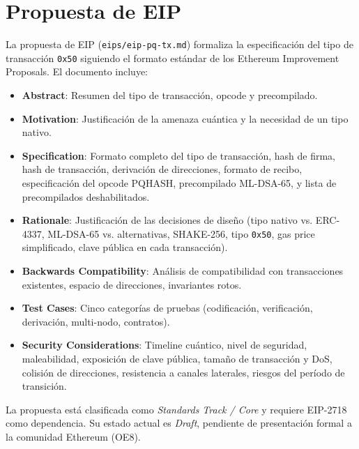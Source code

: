\section{Propuesta de EIP}
\label{sec:dev_eip}

La propuesta de EIP (\texttt{eips/eip-pq-tx.md}) formaliza la especificación del tipo de transacción \texttt{0x50} siguiendo el formato estándar de los Ethereum Improvement Proposals. El documento incluye:

\begin{itemize}
  \item \textbf{Abstract}: Resumen del tipo de transacción, opcode y precompilado.
  \item \textbf{Motivation}: Justificación de la amenaza cuántica y la necesidad de un tipo nativo.
  \item \textbf{Specification}: Formato completo del tipo de transacción, hash de firma, hash de transacción, derivación de direcciones, formato de recibo, especificación del opcode PQHASH, precompilado ML-DSA-65, y lista de precompilados deshabilitados.
  \item \textbf{Rationale}: Justificación de las decisiones de diseño (tipo nativo vs. ERC-4337, ML-DSA-65 vs. alternativas, SHAKE-256, tipo \texttt{0x50}, gas price simplificado, clave pública en cada transacción).
  \item \textbf{Backwards Compatibility}: Análisis de compatibilidad con transacciones existentes, espacio de direcciones, invariantes rotos.
  \item \textbf{Test Cases}: Cinco categorías de pruebas (codificación, verificación, derivación, multi-nodo, contratos).
  \item \textbf{Security Considerations}: Timeline cuántico, nivel de seguridad, maleabilidad, exposición de clave pública, tamaño de transacción y DoS, colisión de direcciones, resistencia a canales laterales, riesgos del período de transición.
\end{itemize}

La propuesta está clasificada como \emph{Standards Track / Core} y requiere EIP-2718 como dependencia. Su estado actual es \emph{Draft}, pendiente de presentación formal a la comunidad Ethereum (OE8).
